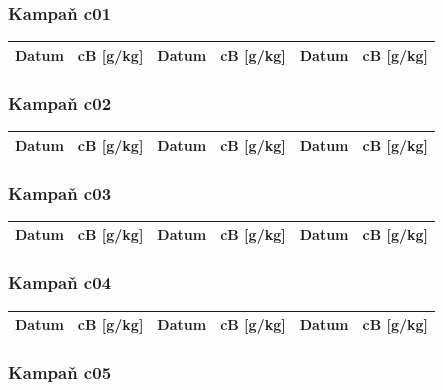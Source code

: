 \documentclass[a4paper,twoside,11pt]{article}
\begin{document}
\subsubsection{Kampaň c01}

\begin{tabular}{|l|l||l|l||l|l|}
\hline
Datum & cB [g/kg] & Datum & cB [g/kg] & Datum & cB [g/kg] \\
\hline

\end{tabular}





\subsubsection{Kampaň c02}

\begin{tabular}{|l|l||l|l||l|l|}
\hline
Datum & cB [g/kg] & Datum & cB [g/kg] & Datum & cB [g/kg] \\
\hline

\end{tabular}





\subsubsection{Kampaň c03}

\begin{tabular}{|l|l||l|l||l|l|}
\hline
Datum & cB [g/kg] & Datum & cB [g/kg] & Datum & cB [g/kg] \\
\hline

\end{tabular}





\subsubsection{Kampaň c04}

\begin{tabular}{|l|l||l|l||l|l|}
\hline
Datum & cB [g/kg] & Datum & cB [g/kg] & Datum & cB [g/kg] \\
\hline

\end{tabular}





\subsubsection{Kampaň c05}
\end{document}

